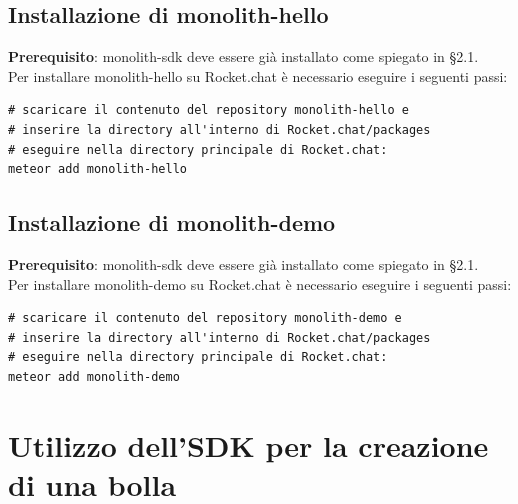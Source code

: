 \subsection{Installazione di monolith-hello}
\textbf{Prerequisito}: monolith-sdk deve essere già installato come spiegato in \S 2.1. \\
Per installare monolith-hello su Rocket.chat è necessario eseguire i seguenti passi: 

\begin{lstlisting}
# scaricare il contenuto del repository monolith-hello e 
# inserire la directory all'interno di Rocket.chat/packages
# eseguire nella directory principale di Rocket.chat:
meteor add monolith-hello
\end{lstlisting}


\subsection{Installazione di monolith-demo}
\textbf{Prerequisito}: monolith-sdk deve essere già installato come spiegato in \S 2.1. \\
Per installare monolith-demo su Rocket.chat è necessario eseguire i seguenti passi: 

\begin{lstlisting}
# scaricare il contenuto del repository monolith-demo e 
# inserire la directory all'interno di Rocket.chat/packages
# eseguire nella directory principale di Rocket.chat:
meteor add monolith-demo
\end{lstlisting}


\section{Utilizzo dell'SDK per la creazione di una bolla}

